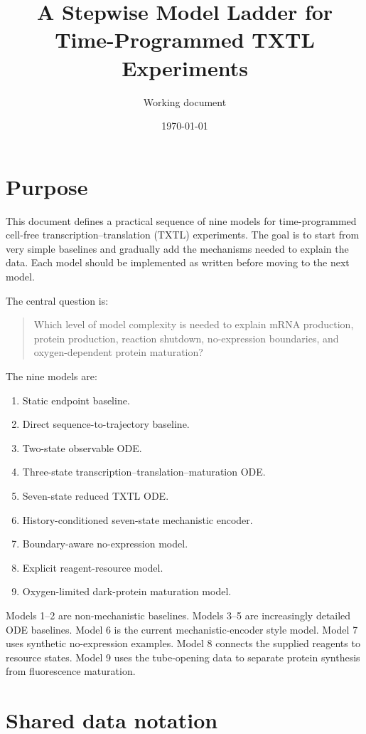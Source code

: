\documentclass[11pt]{article}
\title{A Stepwise Model Ladder for Time-Programmed TXTL Experiments}
\author{Working document}
\date{\today}
\begin{document}
\maketitle

\section{Purpose}

This document defines a practical sequence of nine models for time-programmed cell-free transcription--translation (TXTL) experiments. The goal is to start from very simple baselines and gradually add the mechanisms needed to explain the data. Each model should be implemented as written before moving to the next model.

The central question is:
\begin{quote}
Which level of model complexity is needed to explain mRNA production, protein production, reaction shutdown, no-expression boundaries, and oxygen-dependent protein maturation?
\end{quote}

The nine models are:
\begin{enumerate}[leftmargin=*]
    \item Static endpoint baseline.
    \item Direct sequence-to-trajectory baseline.
    \item Two-state observable ODE.
    \item Three-state transcription--translation--maturation ODE.
    \item Seven-state reduced TXTL ODE.
    \item History-conditioned seven-state mechanistic encoder.
    \item Boundary-aware no-expression model.
    \item Explicit reagent-resource model.
    \item Oxygen-limited dark-protein maturation model.
\end{enumerate}

Models 1--2 are non-mechanistic baselines. Models 3--5 are increasingly detailed ODE baselines. Model 6 is the current mechanistic-encoder style model. Model 7 uses synthetic no-expression examples. Model 8 connects the supplied reagents to resource states. Model 9 uses the tube-opening data to separate protein synthesis from fluorescence maturation.

\section{Shared data notation}
\end{document}
